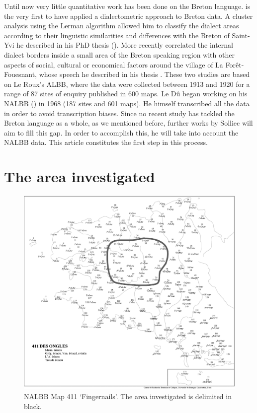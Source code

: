 \documentclass[output=paper]{LSP/langsci}
\begin{document}
Until now very little quantitative work has been done on the Breton language. \citet{german_etude_1984,german_methode_1991} is the very first to have applied a dialectometric approach to Breton data. A cluster analysis using the Lerman algorithm allowed him to classify the dialect areas according to their linguistic similarities and differences with the Breton of Saint-Yvi he described in his PhD thesis (\citeyear{german_etude_1984}). More recently \citet{costaouec_linguistic_2012} correlated the internal dialect borders inside a small area of the Breton speaking region with other aspects of social, cultural or economical factors around the village of La Forêt-Fouesnant, whose speech he described in his thesis \citep{costaouec_breton_1998}. These two studies are based on Le Roux's ALBB, where the data were collected between 1913 and 1920 for a range of 87 sites of enquiry published in 600 maps. Le Dû began working on his NALBB (\citeyear{le_du_nouvel_2001}) in 1968 (187 sites and 601 maps). He himself transcribed all the data in order to avoid transcription biases. Since no recent study has tackled the Breton language as a whole, as we mentioned before, further works by Solliec will aim to fill this gap. In order to accomplish this, he will take into account the NALBB data. This article constitutes the first step in this process.

\section{The area investigated}

\begin{figure}
\includegraphics[width=.9\textwidth]{illustrations/brun_etal_fig2}
\caption{NALBB Map 411 ‘Fingernails’. The area investigated is delimited in black.}
\end{figure}
\end{document}
